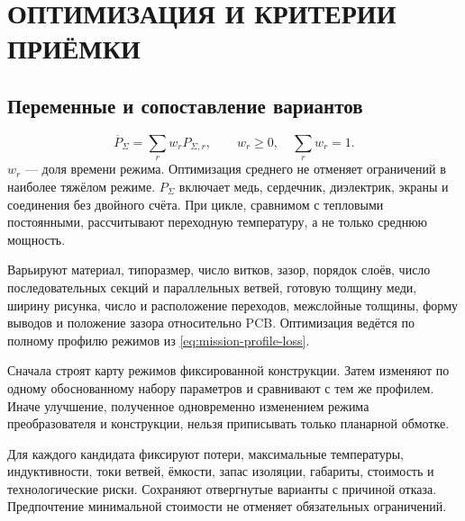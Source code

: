 \documentclass[14pt,a4paper]{extarticle}
\begin{document}
\section{ОПТИМИЗАЦИЯ И КРИТЕРИИ ПРИЁМКИ}
\label{pl:acceptance}
\subsection{Переменные и сопоставление вариантов}

\begin{equation}
 \overline P_\Sigma=\sum_r w_rP_{\Sigma,r},\qquad
 w_r\geq0,\quad\sum_r w_r=1.
 \label{eq:mission-profile-loss}
\end{equation}
$w_r$ --- доля времени режима. Оптимизация среднего не отменяет ограничений в наиболее тяжёлом режиме. $P_\Sigma$ включает медь, сердечник, диэлектрик, экраны и соединения без двойного счёта. При цикле, сравнимом с тепловыми постоянными, рассчитывают переходную температуру, а не только среднюю мощность.

Варьируют материал, типоразмер, число витков, зазор, порядок слоёв, число последовательных секций и параллельных ветвей, готовую толщину меди, ширину рисунка, число и расположение переходов, межслойные толщины, форму выводов и положение зазора относительно PCB. Оптимизация ведётся по полному профилю режимов из \eqref{eq:mission-profile-loss}.

Сначала строят карту режимов фиксированной конструкции. Затем изменяют по одному обоснованному набору параметров и сравнивают с тем же профилем. Иначе улучшение, полученное одновременно изменением режима преобразователя и конструкции, нельзя приписывать только планарной обмотке.

Для каждого кандидата фиксируют потери, максимальные температуры, индуктивности, токи ветвей, ёмкости, запас изоляции, габариты, стоимость и технологические риски. Сохраняют отвергнутые варианты с причиной отказа. Предпочтение минимальной стоимости не отменяет обязательных ограничений.
\end{document}

